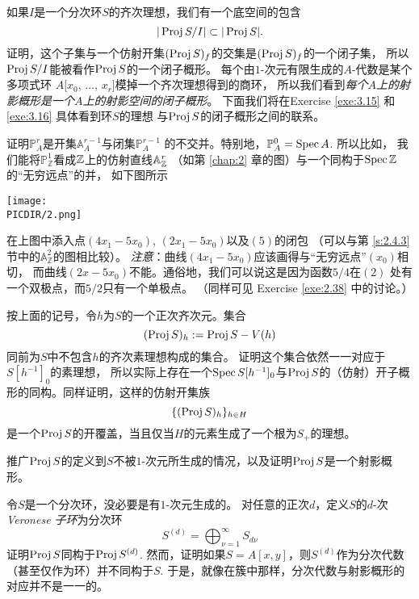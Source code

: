 \begin{exe}\label{exe:3.7}
如果$I$是一个分次环$S$的齐次理想，我们有一个底空间的包含
\[
	|\operatorname{Proj} S/I|\subset |\operatorname{Proj} S|.
\]
证明，这个子集与一个仿射开集$(\operatorname{Proj} S)_f$的交集是$(\operatorname{Proj} S)_f$的一个闭子集，
所以$\operatorname{Proj} S/I$能被看作$\operatorname{Proj} S$的一个闭子概形。
每个由$1$-次元有限生成的$A$-代数是某个多项式环
$A[x_0$, $\dots$, $x_r]$模掉一个齐次理想得到的商环，
所以我们看到\textit{每个$A$上的射影概形是一个$A$上的射影空间的闭子概形}。
下面我们将在Exercise \ref{exe:3.15} 和 \ref{exe:3.16} 具体看到环$S$的理想
与$\operatorname{Proj} S$的闭子概形之间的联系。
\end{exe}

\begin{exe}\label{exe:3.8}
证明$\mathbb P_A^r$是开集$\mathbb A_A^{r-1}$与闭集$\mathbb P_A^{r-1}$
的不交并。特别地，$\mathbb P^0_A=\operatorname{Spec} A$. 所以比如，
我们能将$\mathbb P_{\mathbb Z}^1$看成$\mathbb{Z}$上的仿射直线$\mathbb A_{\mathbb{Z}}^r$
（如第 \ref{chap:2} 章的图）与一个同构于$\operatorname{Spec} \mathbb{Z}$的“无穷远点”的并，
如下图所示

\begin{center}\texttt{[image: \\PICDIR/2.png]}\end{center}
\end{exe}

\begin{exe}\label{exe:3.9}
在上图中添入点$(4x_1-5x_0)$, $(2x_1-5x_0)$以及$(5)$的闭包
（可以与第 \ref{s:2.4.3} 节中的$\mathbb A_{\mathbb Z}^2$的图相比较）。
\textit{注意}：曲线$(4x_1-5x_0)$应该画得与“无穷远点”$(x_0)$相切，
而曲线$(2x-5x_0)$不能。通俗地，我们可以说这是因为函数$5/4$在$(2)$
处有一个双极点，而$5/2$只有一个单极点。
（同样可见 Exercise \ref{exe:2.38} 中的讨论。）
\end{exe}

\begin{exe}\label{exe:3.10}
按上面的记号，令$h$为$S$的一个正次齐次元。集合
\[
	(\operatorname{Proj} S)_h:=\operatorname{Proj} S-V(h)
\]
同前为$S$中不包含$h$的齐次素理想构成的集合。
证明这个集合依然一一对应于$S[h^{-1}]_0$的素理想，
所以实际上存在一个$\operatorname{Spec} S[h^{-1}]_0$与$\operatorname{Proj} S$的（仿射）开子概形的同构。同样证明，这样的仿射开集族
\[
	\{(\operatorname{Proj} S)_h\}_{h\in H}
\]
是一个$\operatorname{Proj} S$的开覆盖，当且仅当$H$的元素生成了一个根为$S_+$的理想。
\end{exe}

\begin{exe}\label{exe:3.11}
推广$\operatorname{Proj} S$的定义到$S$不被$1$-次元所生成的情况，以及证明$\operatorname{Proj} S$是一个射影概形。
\end{exe}

\begin{exe}\label{exe:3.12}
令$S$是一个分次环，没必要是有$1$-次元生成的。
对任意的正次$d$，定义$S$的$d$-次\textit{Veronese 子环}为分次环
\[
	S^{(d)}=\bigoplus_{\nu=1}^\infty S_{d\nu}
\]
证明$\operatorname{Proj} S$同构于$\operatorname{Proj} S^{(d)}$. 
然而，证明如果$S=A[x,y]$，则$S^{(d)}$作为分次代数（甚至仅作为环）并不同构于$S$. 
于是，就像在簇中那样，分次代数与射影概形的对应并不是一一的。
\end{exe}

